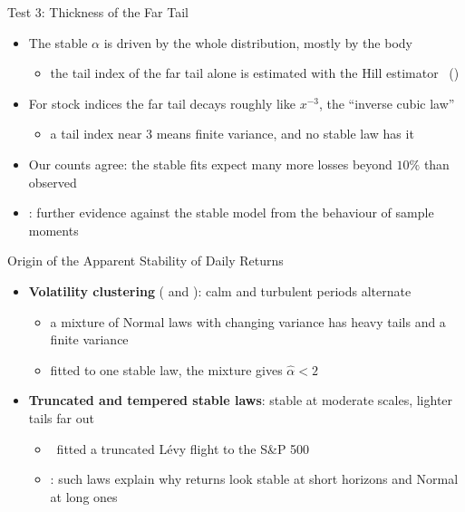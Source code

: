\begin{frame}{Test 3: Thickness of the Far Tail}
\itemsize{\small}
\begin{itemize}
    \item The stable $\alpha$ is driven by the whole distribution, mostly by the body
    \begin{itemize}
        \item the tail index of the far tail alone is estimated with the Hill estimator \ ()
    \end{itemize}
    \item For stock indices the far tail decays roughly like $x^{-3}$, the ``inverse cubic law'' 
    \begin{itemize}
        \item a tail index near 3 means finite variance, and no stable law has it
    \end{itemize}
    \item Our counts agree: the stable fits expect many more losses beyond $10\%$ than observed
    \item {}: further evidence against the stable model from the behaviour of sample moments
\end{itemize}
\end{frame}

\begin{frame}{Origin of the Apparent Stability of Daily Returns}
\itemsize{\small}
\begin{itemize}
    \item \textbf{Volatility clustering} ( and ): calm and turbulent periods alternate
    \begin{itemize}
        \item a mixture of Normal laws with changing variance has heavy tails and a finite variance 
        \item fitted to one stable law, the mixture gives $\hat\alpha < 2$
    \end{itemize}
    \item \textbf{Truncated and tempered stable laws}: stable at moderate scales, lighter tails far out
    \begin{itemize}
        \item {}\ fitted a truncated Lévy flight to the S\&P 500
        \item {}: such laws explain why returns look stable at short horizons and Normal at long ones
    \end{itemize}
\end{itemize}
\end{frame}

